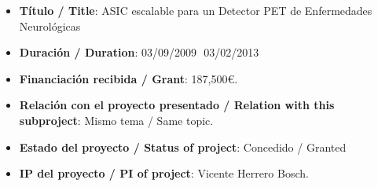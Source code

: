 \begin{enumerate}
\begin{itemize}
\item {\bf Título / Title}:  ASIC escalable para un Detector PET de Enfermedades Neurológicas
\item {\bf Duración / Duration}: 03/09/2009  03/02/2013
\item {\bf Financiación recibida / Grant}: 187,500\euro. 
\item {\bf Relación con el proyecto presentado / Relation with this subproject}: Mismo tema / Same topic. 
\item {\bf Estado del proyecto / Status of project}: Concedido / Granted
\item {\bf IP del proyecto / PI of project}: Vicente Herrero Bosch.
\end{itemize}
\end{enumerate}
